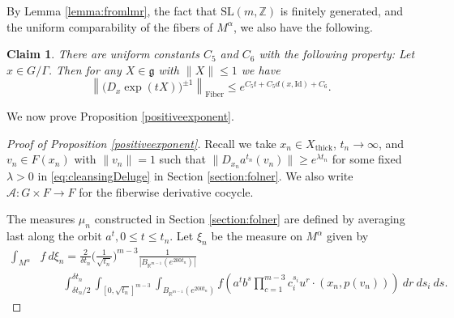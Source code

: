 \documentclass[10pt,reqno]{amsart}
\theoremstyle{Theorem}
\newtheorem{claim}[theorem]{Claim}
\theoremstyle{definition}
\theoremstyle{remark}
\newcommand{\note}[1]{\marginpar{{\color{red}\footnotesize \begin{spacing}{1}#1\end{spacing}}}}
\def\Fib{\mathrm{Fiber}}
\newcommand{\R}{\mathbb {R}}
\newcommand{\Z}{\mathbb {Z}}
\newcommand{\Xt}{X_{\mathrm{thick}}}
\newcommand{\Sl}{\mathrm{SL}}
\newcommand{\id}{\mathrm{Id}}
\def\calA{\mathcal A}
\newcommand{\lieg}{\mathfrak g}
\def\blue{}
\begin{document}
{%
%
%

By Lemma \ref{lemma:fromlmr}, the fact that $\Sl(m,\Z)$ is finitely generated, and the uniform comparability of the fibers of $M^\alpha$,  we also have the following.%
\begin{claim}\label{claim90} There are uniform constants $C_5$ and $C_6$ with the following property:
Let $x\in G/\Gamma$.  Then for any $X\in \lieg$ with $\|X\|\le 1$ we have $$\left\|\big(D_{x} \exp (tX) \big)^{\blue \pm 1} \right\|_{\Fib}\le e^{C_5 t + C_5 d(x, \id) + C_6}.$$
\end{claim}



We now prove Proposition \ref{positiveexponent}.
\begin{proof}[Proof of Proposition \ref{positiveexponent}]
Recall we take $x_n\in \Xt$, $t_n\to \infty $, and $v_n \in F(x_n)$ with $\|v_n\| =1$ such that
$\|D_{x_n}a^{t_n} (v_n)\| \geq e^{\lambda t_n}$
for some fixed $\lambda>0$  in \eqref{eq:cleansingDeluge} in Section \ref{section:folner}.    We  also write $\calA\colon G\times F\to F$ for the fiberwise derivative cocycle.


The measures $\mu_n$ constructed in Section \ref{section:folner} are   defined by averaging last along the orbit $a^t, 0\le t\le t_n$.
Let $\xi_n$ be the measure on $M^\alpha$ given by
\begin{equation*}
\begin{aligned}
\int_{M^\alpha } &f \ d \xi_n ={  \frac{2}{\delta t_n}\bigg(\frac{1}{\sqrt{t_n}} }\bigg)^{m-3}\frac{ 1}{|B_{\R^{m-1}}(e^{200t_n})|}
\\&\quad \quad     \int_{\delta t_n /2}^{\delta t_n} \int_{[0, \sqrt{t_n}]^{m-3}}
\int_{B_{\R^{m-1}}(e^{200t_n})} f\left (a^tb^s\prod_{c=1}^{m-3} c_i^{s_i}u^r \cdot (x_n, p(v_n) )\right ) \  dr   \ d{s_i}\ ds.
 \end{aligned}
 \end{equation*}


\end{proof}}
\end{document}
